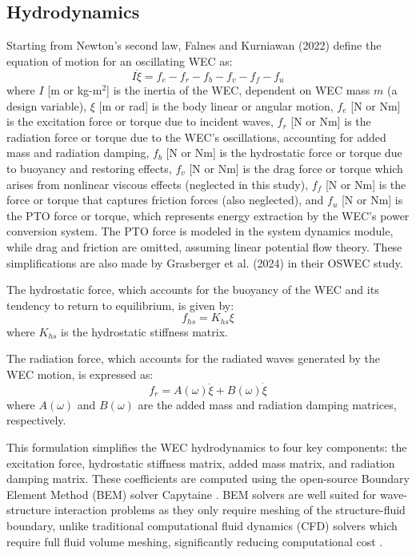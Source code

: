 \documentclass[twocolumn,10pt]{asme2e}
\begin{document}
\subsection{Hydrodynamics} \label{sec:hydro}
Starting from Newton's second law, Falnes and Kurniawan (2022) \cite{falnes2022} define the equation of motion for an oscillating WEC as:
\begin{equation}
    \label{eq:cummins}
    I\ddot{\xi} = f_e - f_r - f_b - f_v - f_f - f_u  
\end{equation}
\noindent where $I$ [m or kg-m$^2$] is the inertia of the WEC, dependent on WEC mass $m$ (a design variable), $\xi$ [m or rad] is the body linear or angular motion, $f_e$ [N or Nm] is the excitation force or torque due to incident waves, $f_r$ [N or Nm] is the radiation force or torque due to the WEC’s oscillations, accounting for added mass and radiation damping, $f_b$ [N or Nm] is the hydrostatic force or torque due to buoyancy and restoring effects, $f_v$ [N or Nm] is the drag force or torque which arises from nonlinear viscous effects (neglected in this study), $f_f$ [N or Nm] is the force or torque that captures friction forces (also neglected), and $f_u$ [N or Nm] is the PTO force or torque, which represents energy extraction by the WEC’s power conversion system. The PTO force is modeled in the system dynamics module, while drag and friction are omitted, assuming linear potential flow theory. These simplifications are also made by Grasberger et al. (2024) \cite{Grasberger2024} in their OSWEC study. 

The hydrostatic force, which accounts for the buoyancy of the WEC and its tendency to return to equilibrium, is given by: 
\begin{equation}
    \label{eq:hydrostatic}
    f_{hs} = K_{hs} \xi
\end{equation}
\noindent where $K_{hs}$ is the hydrostatic stiffness matrix.

The radiation force, which accounts for the radiated waves generated by the WEC motion, is expressed as:
\begin{equation}
    \label{eq:radiation}
    f_r = A(\omega) \ddot{\xi} + B(\omega) \dot{\xi}
\end{equation}
\noindent where $A(\omega)$ and $B(\omega)$ are the added mass and radiation damping matrices, respectively.

This formulation simplifies the WEC hydrodynamics to four key components: the excitation force, hydrostatic stiffness matrix, added mass matrix, and radiation damping matrix. These coefficients are computed using the open-source Boundary Element Method (BEM) solver Capytaine \cite{ancellin_capytaine_2019}. BEM solvers are well suited for wave-structure interaction problems as they only require meshing of the structure-fluid boundary, unlike traditional computational fluid dynamics (CFD) solvers which require full fluid volume meshing, significantly reducing computational cost \cite{bem_wave}.
\end{document}
